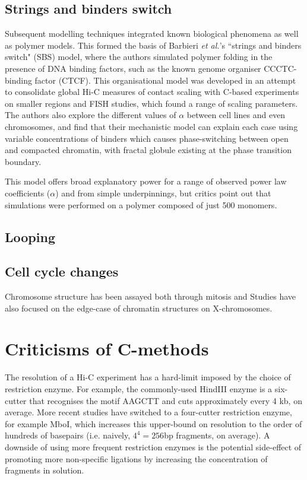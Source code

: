 \documentclass[a4paper,10pt,oneside]{book}
\begin{document}
\subsection{Strings and binders switch}

Subsequent modelling techniques integrated known biological phenomena as well as polymer models. This formed the basis of Barbieri \emph{et al.}'s\cite{Barbieri2012} ``strings and binders switch" (SBS) model, where the authors simulated polymer folding in the presence of DNA binding factors, such as the known genome organiser CCCTC-binding factor (CTCF).\cite{Phillips2009} This organisational model was developed in an attempt to consolidate global Hi-C measures of contact scaling with C-based experiments on smaller regions and FISH studies, which found a range of scaling parameters. The authors also explore the different values of $\alpha$ between cell lines and even chromosomes, and find that their mechanistic model can explain each case using variable concentrations of binders which causes phase-switching between open and compacted chromatin, with fractal globule existing at the phase transition boundary.

This model offers broad explanatory power for a range of observed power law coefficients ($\alpha$) and from simple underpinnings, but critics point out that simulations were performed on a polymer composed of just 500 monomers.

\subsection{Looping}

\subsection{Cell cycle changes}

Chromosome structure has been assayed both through mitosis\cite{Naumova2013} and 
Studies have also focused on the edge-case of chromatin structures on X-chromosomes. 

\section{Criticisms of C-methods}

The resolution of a Hi-C experiment has a hard-limit imposed by the choice of restriction enzyme. For example, the commonly-used HindIII enzyme is a six-cutter that recognises the motif AAGCTT and cuts approximately every 4 kb, on average.\cite{DeWit2012} More recent studies have switched to a four-cutter restriction enzyme, for example MboI,\cite{Rao2014} which increases this upper-bound on resolution to the order of hundreds of basepairs (i.e. naively, $4^{4} = 256$bp fragments, on average). A downside of using more frequent restriction enzymes is the potential side-effect of promoting more non-specific ligations by increasing the concentration of fragments in solution.\cite{Rao2014} 
\end{document}
